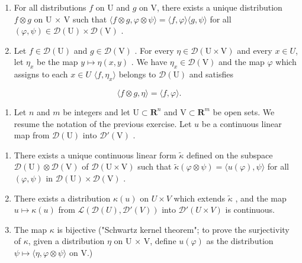 \begin{enumerate}
\def\labelenumi{\alph{enumi})}
\setcounter{enumi}{1}
\item
  For all distributions \(f\) on U and \(g\) on V, there exists a unique distribution \(f \otimes g\) on U × V such that \(\langle f \otimes g, \varphi \otimes \psi \rangle = \langle f, \varphi \rangle \langle g, \psi \rangle\) for all \((\varphi, \psi) \in \mathcal{D}(\mathrm{U}) \times \mathcal{D}(\mathrm{V})\) .
\item
  Let \(f \in \mathcal{D}(\mathrm{U})\) and \(g \in \mathcal{D}(\mathrm{V})\) . For every \(\eta \in \mathcal{D}(\mathrm{U} \times \mathrm{V})\) and every \(x \in U\), let \(\eta_x\) be the map \(y \mapsto \eta(x, y)\) . We have \(\eta_x \in \mathcal{D}(\mathrm{V})\) and the map \(\varphi\) which assigns to each \(x \in U\) \(\langle f, \eta_x \rangle\) belongs to \(\mathcal{D}(\mathrm{U})\) and satisfies
\end{enumerate}

\[
\langle f \otimes g, \eta \rangle = \langle f, \varphi \rangle .
\]

\begin{enumerate}
\def\labelenumi{\arabic{enumi})}
\setcounter{enumi}{28}
\tightlist
\item
  Let \(n\) and \(m\) be integers and let \(\mathrm{U} \subset \mathbf{R}^n\) and \(\mathrm{V} \subset \mathbf{R}^m\) be open sets. We resume the notation of the previous exercise. Let \(u\) be a continuous linear map from \(\mathcal{D}(\mathrm{U})\) into \(\mathcal{D}'(\mathrm{V})\) .
\end{enumerate}

\begin{enumerate}
\def\labelenumi{\alph{enumi})}
\item
  There exists a unique continuous linear form \(\widetilde{\kappa}\) defined on the subspace \(\mathcal{D}(\mathrm{U})\otimes \mathcal{D}(\mathrm{V})\) of \(\mathcal{D}(\mathrm{U}\times \mathrm{V})\) such that \(\widetilde{\kappa} (\varphi \otimes \psi) = \langle u(\varphi),\psi \rangle\) for all \((\varphi ,\psi)\) in \(\mathcal{D}(\mathrm{U})\times \mathcal{D}(\mathrm{V})\) .
\item
  There exists a distribution \(\kappa(u)\) on \(U \times V\) which extends \(\widetilde{\kappa}\) , and the map \(u \mapsto \kappa(u)\) from \(\mathcal{L}(\mathcal{D}(U), \mathcal{D}'(V))\) into \(\mathcal{D}'(U \times V)\) is continuous.
\item
  The map \(\kappa\) is bijective ("Schwartz kernel theorem"; to prove the surjectivity of \(\kappa\), given a distribution \(\eta\) on U × V, define \(u(\varphi)\) as the distribution \(\psi \mapsto \langle \eta, \varphi \otimes \psi \rangle\) on V.)
\end{enumerate}

